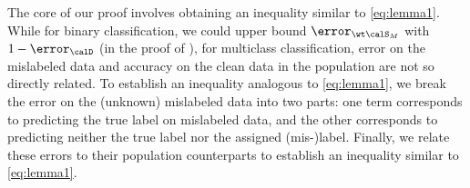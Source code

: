 The core of our proof involves
obtaining an inequality 
similar to \eqref{eq:lemma1}. 
While for binary classification, 
we could upper bound $\error_{\wt \calS_M}$ 
with $1-\error_\calD$ 
(in the proof of ), 
for multiclass classification, 
error on the mislabeled data 
and accuracy on the clean data 
in the population 
are not so directly related.  
% 
To establish an inequality 
analogous to \eqref{eq:lemma1},
we break the error on the 
(unknown) mislabeled data 
into two parts: one term corresponds 
to predicting the true label on mislabeled data, 
and the other corresponds to predicting 
neither the true label 
nor the assigned (mis-)label.  
Finally, we relate these errors to their
population counterparts to establish 
an inequality similar to \eqref{eq:lemma1}. 



% 
% 



